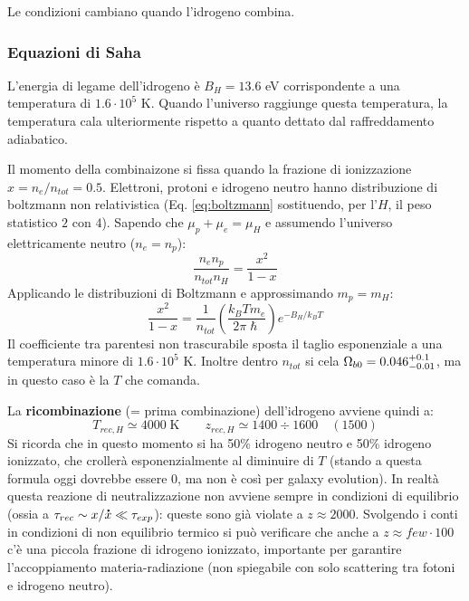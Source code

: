 {Le condizioni cambiano quando l'idrogeno combina.

\subsubsection{Equazioni di Saha}
L'energia di legame dell'idrogeno è $B_H=13.6$ eV corrispondente a una temperatura di $1.6\cdot 10^5$ K. Quando l'universo raggiunge questa temperatura, la temperatura cala ulteriormente rispetto a quanto dettato dal raffreddamento adiabatico. 

Il momento della combinaizone si fissa quando la frazione di ionizzazione $x=n_e/n_{tot}=0.5$. Elettroni, protoni e idrogeno neutro hanno distribuzione di boltzmann non relativistica (Eq. \ref{eq:boltzmann} sostituendo, per l'$H$, il peso statistico $2$ con $4$). Sapendo che $\mu_p + \mu_e = \mu_H$ e assumendo l'universo elettricamente neutro ($n_e=n_p$):
\begin{equation}
    \frac{n_e n_p}{n_{tot}n_H}=\frac{x^2}{1-x}
\end{equation}
Applicando le distribuzioni di Boltzmann e approssimando $m_p=m_H$:
\begin{equation}
    \frac{x^2}{1-x} = \frac{1}{n_{tot}}\left( \frac{k_B T m_e}{2 \pi \hslash }\right) e^{- B_H / k_B T } 
\end{equation}
Il coefficiente tra parentesi non trascurabile sposta il taglio esponenziale a una temperatura minore di $1.6\cdot 10^5$ K. Inoltre dentro $n_{tot}$ si cela $\Omega_{b0}=0.046^{+0.1}_{-0.01}$, ma in questo caso è la $T$ che comanda. 

\vspace{1em}
La \textbf{ricombinazione} (= prima combinazione) dell'idrogeno avviene quindi a: $$T_{rec,H} \simeq 4000\; \textrm{K} \qquad z_{rec,H}\simeq 1400 \div 1600\quad (1500) $$
Si ricorda che in questo momento si ha 50\% idrogeno neutro e 50\% idrogeno ionizzato, che crollerà esponenzialmente al diminuire di $T$ (stando a questa formula oggi dovrebbe essere $0$, ma non è così per galaxy evolution).
In realtà questa reazione di neutralizzazione non avviene sempre in condizioni di equilibrio (ossia a $\tau_{rec} \sim x/\accentset{\mbox{\large\bfseries .}}{x} \ll \tau_{exp}$): queste sono già violate a $z\approx 2000$. Svolgendo i conti in condizioni di non equilibrio termico si può verificare che anche a $z\approx few \cdot 100$ c'è una piccola frazione di idrogeno ionizzato, importante per garantire l'accoppiamento materia-radiazione (non spiegabile con solo scattering tra fotoni e idrogeno neutro).

}
